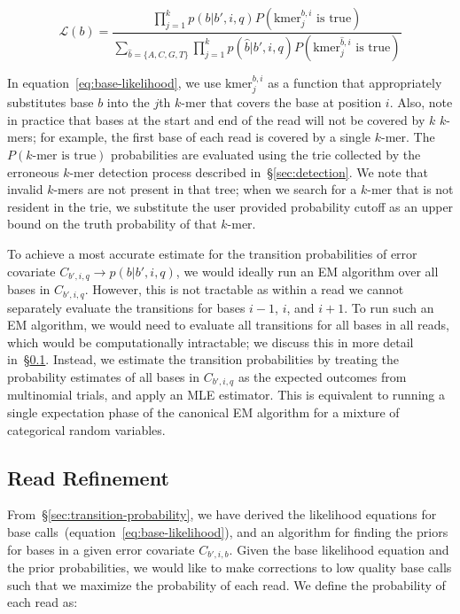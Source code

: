 \documentclass{llncs}
\begin{document}
\begin{equation}
\label{eq:base-likelihood}
\mathcal{L}(b) = \frac{\prod_{j = 1}^{k} p(b | b', i, q) P(\text{kmer}_j^{b, i} \text{ is true})}{\sum_{\hat{b} =
\{A, C, G, T\}} \prod_{j = 1}^{k} p(\hat{b} | b', i, q) P(\text{kmer}_j^{\hat{b}, i} \text{ is true})}
\end{equation}

In equation~\eqref{eq:base-likelihood}, we use $\text{kmer}_j^{b, i}$ as a function that appropriately
substitutes base $b$ into the $j$th $k$-mer that covers the base at position $i$. Also, note in practice
that bases at the start and end of the read will not be covered by $k$ $k$-mers; for example, the first
base of each read is covered by a single $k$-mer. The $P(k\text{-mer is true})$ probabilities
are evaluated using the trie collected by the erroneous $k$-mer detection process described
in~\S\ref{sec:detection}. We note that invalid $k$-mers are not present in that tree; when we search for
a $k$-mer that is not resident in the trie, we substitute the user provided probability cutoff as an upper
bound on the truth probability of that $k$-mer.

To achieve a most accurate estimate for the transition probabilities of error covariate $C_{b', i, q}
\rightarrow p(b | b', i, q)$, we would ideally run an EM algorithm over all bases in $C_{b', i, q}$.
However, this is not  tractable as within a read we cannot separately evaluate the transitions for bases
$i - 1$, $i$, and $i + 1$. To run such an EM algorithm, we would need to evaluate all transitions for all
bases in all reads, which would be computationally intractable; we discuss this in more detail
in~\S\ref{sec:read-refinement}. Instead, we estimate the transition probabilities by treating the
probability estimates of all bases in $C_{b', i, q}$ as the expected outcomes from multinomial trials, and 
apply an MLE estimator. This is equivalent to running a single expectation phase of the canonical EM
algorithm for a mixture of categorical random variables.

\subsection{Read Refinement}
\label{sec:read-refinement}

From~\S\ref{sec:transition-probability}, we have derived the likelihood equations for base
calls~(equation~\eqref{eq:base-likelihood}), and an algorithm for finding the priors for bases in a given
error covariate $C_{b', i, b}$. Given the base likelihood equation and the prior probabilities, we would
like to make corrections to low quality base calls such that we maximize the probability of each read.
We define the probability of each read as:
\end{document}
